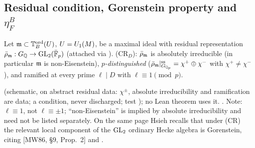 \subsection{Residual condition, Gorenstein property and \texorpdfstring{$\eta^B_F$}{eta B F}}

\begin{hypothesis}\label{hyp:s04-CR}
Let $\mathfrak{m}\subset\mathbb{T}^{\mathrm{ord}}_B(U)$, $U=U_1(M)$, be a maximal ideal with residual representation $\bar\rho_{\mathfrak{m}}:G_{\mathbb{Q}}\to\mathrm{GL}_2(\bar{\mathbb{F}}_p)$
(attached via ). (CR$_D$): $\bar\rho_{\mathfrak{m}}$ is absolutely irreducible (in particular $\mathfrak{m}$ is non-Eisenstein),
\emph{$p$-distinguished} ($\bar\rho_{\mathfrak{m}}|_{G_{\mathbb{Q}_p}}^{\rm ss}=\chi^+\oplus\chi^-$ with $\chi^+\ne\chi^-$), and ramified at every prime
$\ell\mid D$ with $\ell\equiv1\pmod p$.
\end{hypothesis}
\noindent{} (schematic, on abstract residual data: $\chi^\pm$, absolute irreducibility and ramification are data; a condition, never discharged; test
); no Lean theorem uses it. \stcited{} . Note: $\ell\equiv1$, not $\ell\equiv\pm1$; ``non-Eisenstein'' is implied by
absolute irreducibility and need not be listed separately. On the same page Hsieh recalls that under (CR) the relevant local
component of the $\mathrm{GL}_2$ ordinary Hecke algebra is Gorenstein, citing [MW86, \S9, Prop.~2] and
.


